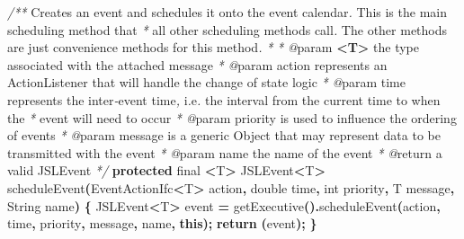 \documentclass[
]{book}
\newenvironment{Shaded}{\begin{snugshade}}{\end{snugshade}}
\newcommand{\BuiltInTok}[1]{#1}
\newcommand{\CommentTok}[1]{\textcolor[rgb]{0.56,0.35,0.01}{\textit{#1}}}
\newcommand{\ControlFlowTok}[1]{\textcolor[rgb]{0.13,0.29,0.53}{\textbf{#1}}}
\newcommand{\DataTypeTok}[1]{\textcolor[rgb]{0.13,0.29,0.53}{#1}}
\newcommand{\FunctionTok}[1]{\textcolor[rgb]{0.00,0.00,0.00}{#1}}
\newcommand{\KeywordTok}[1]{\textcolor[rgb]{0.13,0.29,0.53}{\textbf{#1}}}
\newcommand{\NormalTok}[1]{#1}
\newcommand{\OperatorTok}[1]{\textcolor[rgb]{0.81,0.36,0.00}{\textbf{#1}}}
\theoremstyle{definition}
\theoremstyle{definition}
\theoremstyle{definition}
\theoremstyle{definition}
\theoremstyle{remark}
\begin{document}
\begin{Shaded}
\begin{Highlighting}[]
\CommentTok{/**}\NormalTok{ Creates an event and schedules it onto the event calendar}\CommentTok{. }\NormalTok{ This is the main scheduling method that}
 \CommentTok{*}\NormalTok{ all other scheduling methods call}\CommentTok{.}\NormalTok{  The other methods are just convenience methods for this method}\CommentTok{.}
 \CommentTok{*}
 \CommentTok{*} \CommentTok{@}\NormalTok{param }\KeywordTok{\textless{}T\textgreater{}}\NormalTok{ the type associated with the attached message}
 \CommentTok{*} \CommentTok{@}\NormalTok{param action represents an ActionListener that will handle the change of state logic}
 \CommentTok{*} \CommentTok{@}\NormalTok{param time represents the inter}\CommentTok{{-}}\NormalTok{event time}\CommentTok{,}\NormalTok{ i}\CommentTok{.}\NormalTok{e}\CommentTok{.}\NormalTok{ the interval from the current time to when the}
 \CommentTok{*}\NormalTok{        event will need to occur}
 \CommentTok{*} \CommentTok{@}\NormalTok{param priority is used to influence the ordering of events}
 \CommentTok{*} \CommentTok{@}\NormalTok{param message is a generic Object that may represent data to be transmitted with the event}
 \CommentTok{*} \CommentTok{@}\NormalTok{param name the name of the event}
 \CommentTok{*} \CommentTok{@}\NormalTok{return a valid JSLEvent}
 \CommentTok{*/}
\KeywordTok{protected} \DataTypeTok{final} \OperatorTok{\textless{}}\NormalTok{T}\OperatorTok{\textgreater{}}\NormalTok{ JSLEvent}\OperatorTok{\textless{}}\NormalTok{T}\OperatorTok{\textgreater{}} \FunctionTok{scheduleEvent}\OperatorTok{(}\NormalTok{EventActionIfc}\OperatorTok{\textless{}}\NormalTok{T}\OperatorTok{\textgreater{}}\NormalTok{ action}\OperatorTok{,} \DataTypeTok{double}\NormalTok{ time}\OperatorTok{,} \DataTypeTok{int}\NormalTok{ priority}\OperatorTok{,}\NormalTok{ T message}\OperatorTok{,} \BuiltInTok{String}\NormalTok{ name}\OperatorTok{)} \OperatorTok{\{}
\NormalTok{    JSLEvent}\OperatorTok{\textless{}}\NormalTok{T}\OperatorTok{\textgreater{}}\NormalTok{ event }\OperatorTok{=} \FunctionTok{getExecutive}\OperatorTok{().}\FunctionTok{scheduleEvent}\OperatorTok{(}\NormalTok{action}\OperatorTok{,}\NormalTok{ time}\OperatorTok{,}\NormalTok{ priority}\OperatorTok{,}\NormalTok{ message}\OperatorTok{,}\NormalTok{ name}\OperatorTok{,} \KeywordTok{this}\OperatorTok{);}
    \ControlFlowTok{return} \OperatorTok{(}\NormalTok{event}\OperatorTok{);}
\OperatorTok{\}}
\end{Highlighting}
\end{Shaded}
\end{document}
